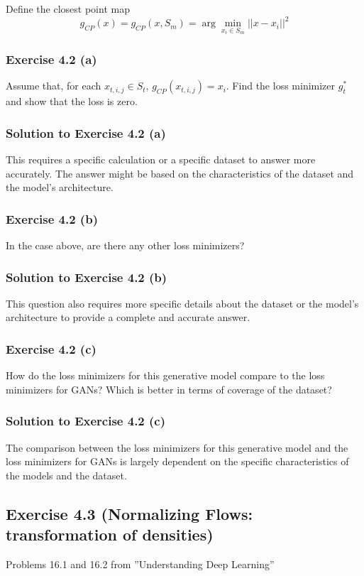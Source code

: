\documentclass[
10pt, %
a4paper, %
oneside, %
headinclude,footinclude, %
BCOR5mm, %
]{scrartcl}
\begin{document}
Define the closest point map
\begin{equation*}
g_{CP}(x) = g_{CP} (x, S_m ) = \arg \min_{x_i \in S_m} ||x - x_i ||^2
\end{equation*}

\subsubsection*{Exercise 4.2 (a)}
Assume that, for each $x_{t,i,j} \in S_t$, $g_{CP}(x_{t,i,j}) = x_i$. Find the loss minimizer $g^*_t$ and show that the loss is zero.

\subsubsection*{Solution to Exercise 4.2 (a)}
This requires a specific calculation or a specific dataset to answer more accurately. The answer might be based on the characteristics of the dataset and the model's architecture.

\subsubsection*{Exercise 4.2 (b)}
In the case above, are there any other loss minimizers?

\subsubsection*{Solution to Exercise 4.2 (b)}
This question also requires more specific details about the dataset or the model's architecture to provide a complete and accurate answer.

\subsubsection*{Exercise 4.2 (c)}
How do the loss minimizers for this generative model compare to the loss minimizers for GANs? Which is better in terms of coverage of the dataset?

\subsubsection*{Solution to Exercise 4.2 (c)}
The comparison between the loss minimizers for this generative model and the loss minimizers for GANs is largely dependent on the specific characteristics of the models and the dataset.

\subsection*{Exercise 4.3 (Normalizing Flows: transformation of densities)}
Problems 16.1 and 16.2 from ”Understanding Deep Learning”
\end{document}
